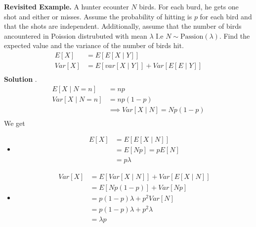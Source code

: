 \documentclass{article}
\theoremstyle{remark}
\begin{document}
   \begin{tcolorbox}
     \textbf{Revisited Example.} A hunter ecounter $N$ birds. For each burd, he gets one shot and either or misses. Assume the probability of hitting is $p$ for each bird and that the shots are independent. Additionally, assume that the number of birds ancountered in Poission distrubuted with mean $\lambda$ I.e $N \sim \text{Passion}\left( \lambda  \right)$. Find the expected value and the variance of the number of birds hit. \[
    \begin{split}
      E\left[ X \right] &=  E \left[ E\left[ X  \mid  Y \right] \right] \\
      Var \left[ X \right]   & =  E\left[ var\left[ X  \mid Y \right] \right] + Var \left[ E\left[ E  \mid Y \right] \right]  \\
    \end{split}  
     \] 
     \textbf{Solution} .
   \[
       \begin{split}
       E\left[ X  \mid N =n  \right] &=  np \\
   Var\left[ X  \mid  N =n \right]   &  =  np\left( 1-p \right) \\
   &\implies  Var\left[ X  \mid  N \right] = N p\left( 1-p \right) \\
       \end{split} 
   \] 
   We get 
   \begin{itemize}
     \item \[
         \begin{split}
     E\left[ X \right] &=  E\left[ E\left[ X  \mid  N \right] \right] \\
     &=  E\left[ Np \right] = p E\left[ N \right] \\
     &=  p \lambda    
         \end{split} 
     \] 
   \item \[
       \begin{split}
   Var\left[ X \right]  & = E\left[ Var\left[ X  \mid N \right] \right] +  Var \left[ E\left[ X  \mid N \right] \right] \\
   &=  E \left[ Np\left( 1-p \right) \right] +  Var\left[ Np \right] \\
   &=  p\left( 1-p \right) \lambda + p^2 Var\left[ N \right] \\
   &=  p\left( 1-p \right) \lambda + p^2 \lambda   \\
   &=  \lambda p    
       \end{split} 
   \] 
     \end{itemize}

   \end{tcolorbox}
   
\end{document}
